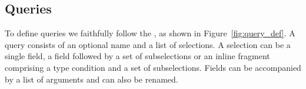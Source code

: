 


\subsection{Queries}\label{subsec:query}
To define queries we faithfully follow the \spec, as shown in
Figure~\ref{fig:query_def}. A query consists of an optional name
 and a list of selections. A selection can be a single field, a field followed by a set of subselections or an inline fragment comprising a type condition and a set of subselections. Fields can be accompanied by a list of arguments and can also be renamed.


